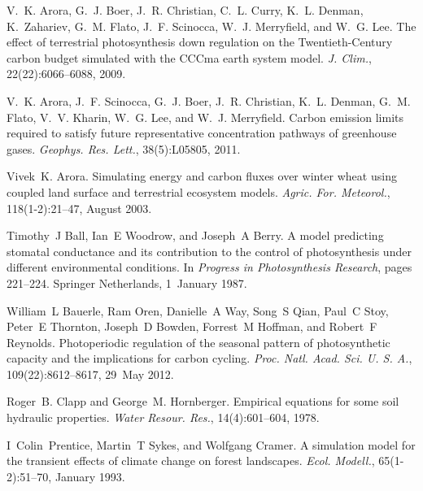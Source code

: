 \begin{DoxyDescription}
\item[\label{_CITEREF_Arora2009-9bc}%
\mbox{[}9\mbox{]}]V.~K. Arora, G.~J. Boer, J.~R. Christian, C.~L. Curry, K.~L. Denman, K.~Zahariev, G.~M. Flato, J.~F. Scinocca, W.~J. Merryfield, and W.~G. Lee. The effect of terrestrial photosynthesis down regulation on the Twentieth-\/\+Century carbon budget simulated with the C\+C\+Cma earth system model. {\itshape J. Clim.}, 22(22)\+:6066--6088, 2009. 


\item[\label{_CITEREF_Arora2011-79f}%
\mbox{[}10\mbox{]}]V.~K. Arora, J.~F. Scinocca, G.~J. Boer, J.~R. Christian, K.~L. Denman, G.~M. Flato, V.~V. Kharin, W.~G. Lee, and W.~J. Merryfield. Carbon emission limits required to satisfy future representative concentration pathways of greenhouse gases. {\itshape Geophys. Res. Lett.}, 38(5)\+:L05805, 2011. 


\item[\label{_CITEREF_Arora2003-3b7}%
\mbox{[}11\mbox{]}]Vivek~K. Arora. Simulating energy and carbon fluxes over winter wheat using coupled land surface and terrestrial ecosystem models. {\itshape Agric. For. Meteorol.}, 118(1-\/2)\+:21--47, August 2003. 


\item[\label{_CITEREF_Ball1987-ou}%
\mbox{[}12\mbox{]}]Timothy~J Ball, Ian~E Woodrow, and Joseph~A Berry. A model predicting stomatal conductance and its contribution to the control of photosynthesis under different environmental conditions. In {\itshape Progress in Photosynthesis Research}, pages 221--224. Springer Netherlands, 1~January 1987. 


\item[\label{_CITEREF_Bauerle2012-c29}%
\mbox{[}13\mbox{]}]William~L Bauerle, Ram Oren, Danielle~A Way, Song~S Qian, Paul~C Stoy, Peter~E Thornton, Joseph~D Bowden, Forrest~M Hoffman, and Robert~F Reynolds. Photoperiodic regulation of the seasonal pattern of photosynthetic capacity and the implications for carbon cycling. {\itshape Proc. Natl. Acad. Sci. U. S. A.}, 109(22)\+:8612--8617, 29~May 2012. 


\item[\label{_CITEREF_Clapp1978-898}%
\mbox{[}14\mbox{]}]Roger~B. Clapp and George~M. Hornberger. Empirical equations for some soil hydraulic properties. {\itshape Water Resour. Res.}, 14(4)\+:601--604, 1978. 


\item[\label{_CITEREF_Prentice1993-xn}%
\mbox{[}15\mbox{]}]I~Colin~Prentice, Martin~T Sykes, and Wolfgang Cramer. A simulation model for the transient effects of climate change on forest landscapes. {\itshape Ecol. Modell.}, 65(1-\/2)\+:51--70, January 1993. 



\end{DoxyDescription}
